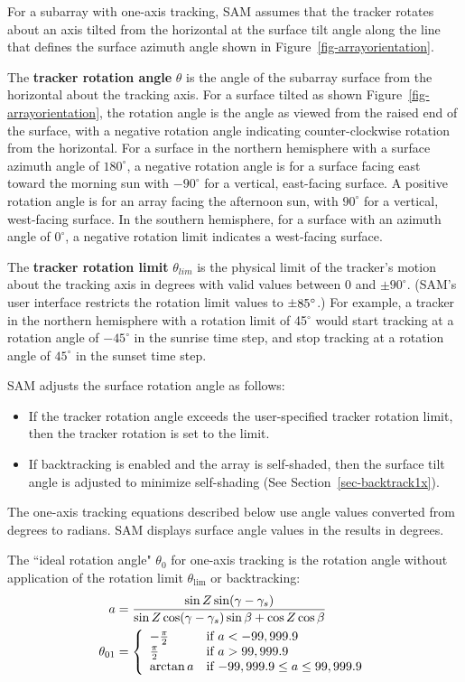 \documentclass[12pt,letterpaper]{article}
\begin{document}
For a subarray with one-axis tracking, SAM assumes that the tracker rotates about an axis tilted from the horizontal at the surface tilt angle along the line that defines the surface azimuth angle shown in Figure~\ref{fig-arrayorientation}. 

The \textbf{tracker rotation angle} $\theta$ is the angle of the subarray surface from the horizontal about the tracking axis. For a surface tilted as shown Figure~\ref{fig-arrayorientation}, the rotation angle is the angle as viewed from the raised end of the surface, with a negative rotation angle indicating counter-clockwise rotation from the horizontal. For a surface in the northern hemisphere with a surface azimuth angle of $180^\circ$, a negative rotation angle is for a surface facing east toward the morning sun with $-90^\circ$ for a vertical, east-facing surface. A positive rotation angle is for an array facing the afternoon sun, with $90^\circ$ for a vertical, west-facing surface.  In the southern hemisphere, for a surface with an azimuth angle of $0^\circ$, a negative rotation limit indicates a west-facing surface.

The \textbf{tracker rotation limit} $\theta_{lim}$ is the physical limit of the tracker's motion about the tracking axis in degrees with valid values between $0$ and $\pm 90^\circ$. (SAM's user interface restricts the rotation limit values to $\pm 85\degree$.) For example, a tracker in the northern hemisphere with a rotation limit of 45$^\circ$ would start tracking at a rotation angle of $-45^\circ$ in the sunrise time step, and stop tracking at a rotation angle of $45^\circ$ in the sunset time step.

SAM adjusts the surface rotation angle as follows:
\begin{itemize}
\item If the tracker rotation angle exceeds the user-specified tracker rotation limit, then the tracker rotation is set to the limit.
\item If backtracking is enabled and the array is self-shaded, then the surface tilt angle is adjusted to minimize self-shading (See Section~\ref{sec-backtrack1x}).
\end{itemize}

The one-axis tracking equations described below use angle values converted from degrees to radians. SAM displays surface angle values in the results in degrees.

The ``ideal rotation angle" $\theta_0$ for one-axis tracking is the rotation angle without application of the rotation limit $\theta_{\mathrm{lim}}$ or backtracking:
\begin{align}
a &= \frac{\sin Z \sin(\gamma - \gamma_s)}{\sin Z \cos(\gamma - \gamma_s) \sin\beta + \cos Z \cos\beta} \notag\\
\theta_{\mathrm{01}} &= \left\{
\begin{array}{ll}
-\frac{\pi}{2} & \text{if $a<-99,999.9$}\\
\frac{\pi}{2} & \text{if $a>99,999.9$}\\
\arctan a & \text{if $-99,999.9 \leq a \leq 99,999.9$}
\end{array}
\right.
\end{align}
\end{document}
